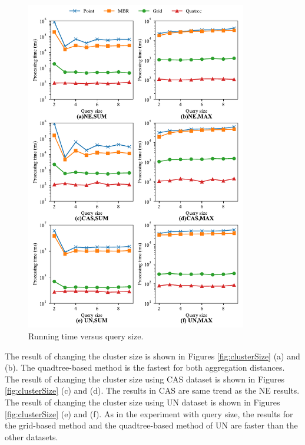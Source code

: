 \documentclass[a4paper,11pt]{report}
\theoremstyle{mytheoremstyle}
\begin{document}
\begin{figure}
    \begin{center}
        \includegraphics[width=0.86\textwidth]{matplotlib/export/querysize.pdf}
    \end{center}
    \caption{Running time versus query size.}
    \label{fig:querySize}
\end{figure}

The result of changing the cluster size is shown in Figures \ref{fig:clusterSize} (a) and (b). The quadtree-based method is the fastest for both aggregation distances.
The result of changing the cluster size using CAS dataset is shown in Figures \ref{fig:clusterSize} (c) and (d). The results in CAS are same trend as the NE results.
The result of changing the cluster size using UN dataset is shown in Figures \ref{fig:clusterSize} (e) and (f). As in the experiment with query size, the results for the grid-based method and the quadtree-based method of UN are faster than the other datasets.
\end{document}
